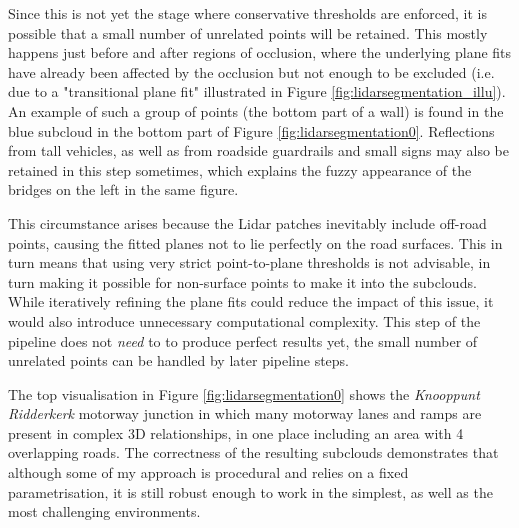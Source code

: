 Since this is not yet the stage where conservative thresholds are enforced, it is possible that a small number of unrelated points will be retained. This mostly happens just before and after regions of occlusion, where the underlying plane fits have already been affected by the occlusion but not enough to be excluded (i.e. due to a "transitional plane fit" illustrated in Figure \ref{fig:lidarsegmentation_illu}). An example of such a group of points (the bottom part of a wall) is found in the blue subcloud in the bottom part of Figure \ref{fig:lidarsegmentation0}. Reflections from tall vehicles, as well as from roadside guardrails and small signs may also be retained in this step sometimes, which explains the fuzzy appearance of the bridges on the left in the same figure.

This circumstance arises because the Lidar patches inevitably include off-road points, causing the fitted planes not to lie perfectly on the road surfaces. This in turn means that using very strict point-to-plane thresholds is not advisable, in turn making it possible for non-surface points to make it into the subclouds. While iteratively refining the plane fits could reduce the impact of this issue, it would also introduce unnecessary computational complexity. This step of the pipeline does not \textit{need} to to produce perfect results yet, the small number of unrelated points can be handled by later pipeline steps. 

The top visualisation in Figure \ref{fig:lidarsegmentation0} shows the \textit{Knooppunt Ridderkerk} motorway junction in which many motorway lanes and ramps are present in complex 3D relationships, in one place including an area with 4 overlapping roads. The correctness of the resulting subclouds demonstrates that although some of my approach is procedural and relies on a fixed parametrisation, it is still robust enough to work in the simplest, as well as the most challenging environments.

